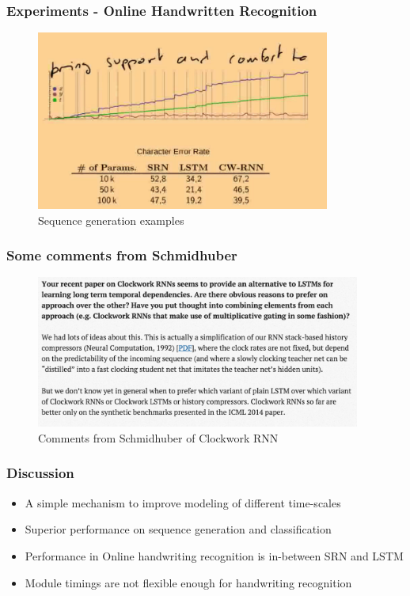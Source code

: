 \documentclass{beamer}
\begin{document}
\frame
{
   \frametitle{Experiments - Online Handwritten Recognition}
   \begin{figure}[ht]  
			\begin{center}
				\includegraphics[width=3.8in]{Images/cwrnn_handwritten.png}   
			\end{center}   
			\caption{\centering Sequence generation examples}
	\end{figure}
}
\frame
{
   \frametitle{Some comments from Schmidhuber}
   \begin{figure}[ht]  
		\begin{center}
			\includegraphics[width=4.2in]{Images/comment_cwrnn.png}   
		\end{center}   
		\caption{Comments from Schmidhuber of Clockwork RNN}
	\end{figure}
}
\frame
{
   \frametitle{Discussion}
   \begin{itemize}
   	\item A simple mechanism to improve modeling of different time-scales
   	\item Superior performance on sequence generation and classification
   	\item Performance in Online handwriting recognition is in-between SRN and LSTM
   	\item Module timings are not flexible enough for handwriting recognition
   \end{itemize}
}
\end{document}
